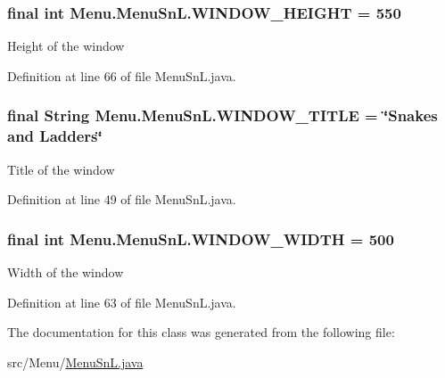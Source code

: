 \subsubsection[{W\+I\+N\+D\+O\+W\+\_\+\+H\+E\+I\+G\+H\+T}]{\setlength{\rightskip}{0pt plus 5cm}final int Menu.\+Menu\+Sn\+L.\+W\+I\+N\+D\+O\+W\+\_\+\+H\+E\+I\+G\+H\+T = 550\hspace{0.3cm}{\ttfamily [private]}}\label{class_menu_1_1_menu_sn_l_a32c2e05c64b453df29d8b6df1061a939}
Height of the window 

Definition at line 66 of file Menu\+Sn\+L.\+java.

\hypertarget{class_menu_1_1_menu_sn_l_a62bbb19bbedcdf63b575b4ae1048c343}{}
\subsubsection[{W\+I\+N\+D\+O\+W\+\_\+\+T\+I\+T\+L\+E}]{\setlength{\rightskip}{0pt plus 5cm}final String Menu.\+Menu\+Sn\+L.\+W\+I\+N\+D\+O\+W\+\_\+\+T\+I\+T\+L\+E = \char`\"{}Snakes and Ladders\char`\"{}\hspace{0.3cm}{\ttfamily [private]}}\label{class_menu_1_1_menu_sn_l_a62bbb19bbedcdf63b575b4ae1048c343}
Title of the window 

Definition at line 49 of file Menu\+Sn\+L.\+java.

\hypertarget{class_menu_1_1_menu_sn_l_a2fcacd6fe04ce3a540d0d100ca57b993}{}
\subsubsection[{W\+I\+N\+D\+O\+W\+\_\+\+W\+I\+D\+T\+H}]{\setlength{\rightskip}{0pt plus 5cm}final int Menu.\+Menu\+Sn\+L.\+W\+I\+N\+D\+O\+W\+\_\+\+W\+I\+D\+T\+H = 500\hspace{0.3cm}{\ttfamily [private]}}\label{class_menu_1_1_menu_sn_l_a2fcacd6fe04ce3a540d0d100ca57b993}
Width of the window 

Definition at line 63 of file Menu\+Sn\+L.\+java.



The documentation for this class was generated from the following file\+:\begin{DoxyCompactItemize}
\item 
src/\+Menu/\hyperlink{_menu_sn_l_8java}{Menu\+Sn\+L.\+java}\end{DoxyCompactItemize}
